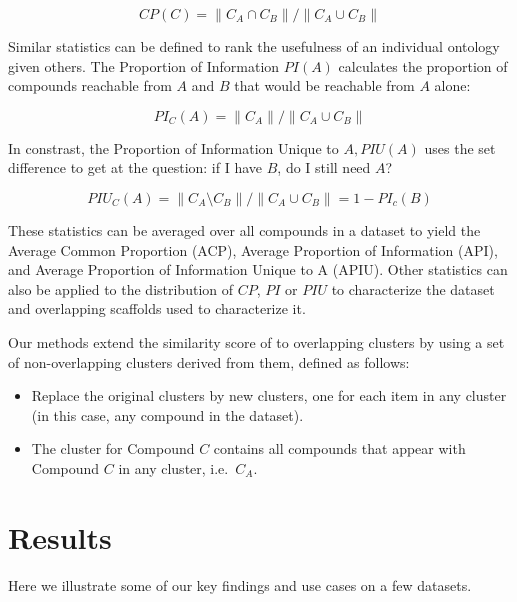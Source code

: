 \documentclass[journal=jacsat,manuscript=article]{achemso}
\newcommand*\ie{i.e.~}
\begin{document}
\begin{equation}
CP(C) = \| C_A \cap C_B \| / \| C_A \cup C_B \|
\end{equation}

Similar statistics can be defined to rank the usefulness of an individual ontology given others. The Proportion of Information $PI(A)$ calculates the proportion of compounds reachable from $A$ and $B$ that would be reachable from $A$ alone:

\begin{equation}
PI_C(A) = \| C_A \| / \| C_A \cup C_B \|
\end{equation}

In constrast, the Proportion of Information Unique to $A, PIU(A)$ uses the set difference to get at the question: if I have $B$, do I still need $A$? 

\begin{equation}
 PIU_C(A) = \| C_A \setminus C_B \| / \| C_A \cup C_B \| = 1 - PI_c(B)
 \end{equation}
  
These statistics can be averaged over all compounds in a dataset to yield the Average Common Proportion (ACP), Average Proportion of Information (API), and Average Proportion of Information Unique to A (APIU).  Other statistics can also be applied to the distribution of $CP$, $PI$ or $PIU$ to characterize the dataset and overlapping scaffolds used to characterize it.

Our methods extend the similarity score of \citeauthor{Torres2009} to
overlapping clusters by using a set of non-overlapping clusters
derived from them, defined as follows:
\begin{itemize}
\item Replace the original clusters by new clusters, one for each item
  in any cluster (in this case, any compound in the dataset).
\item The cluster for Compound $C$ contains all compounds that appear
  with Compound $C$ in any cluster, \ie $C_A$.
\end{itemize}

\section{Results}
\label{sec:results}
Here we illustrate some of our key findings and use cases on a few datasets. 
\end{document}
